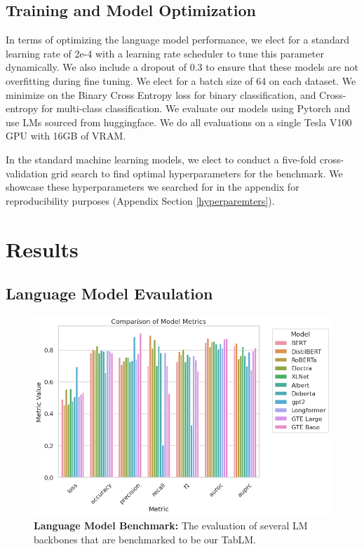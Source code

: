 \documentclass{article}
\theoremstyle{plain}
\theoremstyle{definition}
\theoremstyle{remark}
\begin{document}
\subsection{Training and Model Optimization}

In terms of optimizing the language model performance, we elect for a standard learning rate of 2e-4 with a learning rate scheduler to tune this parameter dynamically. We also include a dropout of 0.3 to ensure that these models are not overfitting during fine tuning. We elect for a batch size of 64 on each dataset. We minimize on the Binary Cross Entropy loss for binary classification, and Cross-entropy for multi-class classification. We evaluate our models using Pytorch and use LMs sourced from huggingface. We do all evaluations on a single Tesla V100 GPU with 16GB of VRAM.

In the standard machine learning models, we elect to conduct a five-fold cross-validation grid search to find optimal hyperparameters for the benchmark. We showcase these hyperparameters we searched for in the appendix for reproducibility purposes (Appendix Section \ref{hyperparemters}).

\section{Results}

\subsection{Language Model Evaulation}

\begin{figure}[h!]
    \centering
    \includegraphics[width=\columnwidth]{models.png}
    \caption{\textbf{Language Model Benchmark:} The evaluation of several LM backbones that are benchmarked to be our TabLM.}
    \label{MS}
\end{figure}
\end{document}
